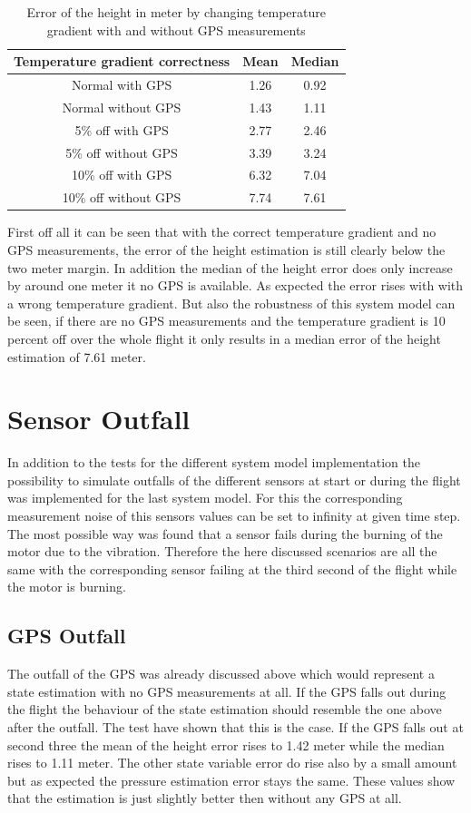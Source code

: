 \begin{table}[h!]
\centering
\begin{tabular}{ccc}
\hline
\multicolumn{1}{|c|}{Temperature gradient correctness} & \multicolumn{1}{|c|}{Mean}& \multicolumn{1}{|c|}{Median} \\ \hline
Normal with GPS 	& 1.26 		& 0.92\\
Normal without GPS	& 1.43	 	& 1.11\\
5\% off with GPS 	& 2.77	 	& 2.46\\
5\% off without GPS 	& 3.39	 	& 3.24\\
10\% off with GPS 	& 6.32	 	& 7.04\\
10\% off without GPS 	& 7.74 		& 7.61
\end{tabular}
\caption{Error of the height in meter by changing temperature gradient with and without GPS measurements}
\label{tab:ErrorChangingTempGradWithWithoutGPS}
\end{table}

First off all it can be seen that with the correct temperature gradient and no GPS measurements,
the error of the height estimation is still clearly below the two meter margin.
In addition the median of the height error does only increase by around one meter it no GPS is available.
As expected the error rises with with a wrong temperature gradient.
But also the robustness of this system model can be seen, if there are no GPS measurements
and the temperature gradient is 10 percent off over the whole flight it only results in a median error of the height estimation of 7.61 meter.

\section{Sensor Outfall}
In addition to the tests for the different system model implementation
the possibility to simulate outfalls of the different sensors at start or during the flight was implemented for the last system model.
For this the corresponding measurement noise of this sensors values can be set to infinity at given time step.
The most possible way was found that a sensor fails during the burning of the motor due to the vibration.
Therefore the here discussed scenarios are all the same with the corresponding sensor failing at the third second of the flight while the motor is burning.

\subsection{GPS Outfall}
The outfall of the GPS was already discussed above which would represent a state estimation with no GPS measurements at all.
If the GPS falls out during the flight the behaviour of the state estimation should resemble the one above after the outfall.
The test have shown that this is the case.
If the GPS falls out at second three the mean of the height error rises to 1.42 meter while the median rises to 1.11 meter.
The other state variable error do rise also by a small amount but as expected the pressure estimation error stays the same.
These values show that the estimation is just slightly better then without any GPS at all.

